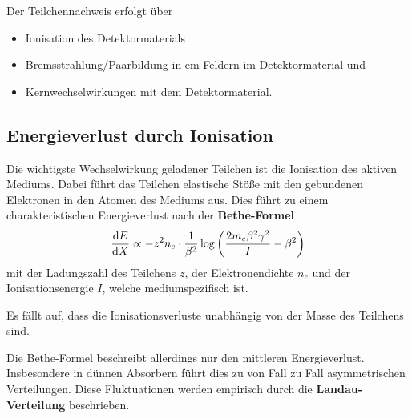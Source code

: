 Der Teilchennachweis erfolgt über
\begin{itemize}
	\item Ionisation des Detektormaterials
	\item Bremsstrahlung/Paarbildung in em-Feldern im Detektormaterial und
	\item Kernwechselwirkungen mit dem Detektormaterial.
\end{itemize}

\subsection{Energieverlust durch Ionisation}
Die wichtigste Wechselwirkung geladener Teilchen ist die Ionisation des aktiven Mediums.
Dabei führt das Teilchen elastische Stöße mit den gebundenen Elektronen in den Atomen des Mediums aus.
Dies führt zu einem charakteristischen Energieverlust nach der \textbf{Bethe-Formel}
\begin{equation*}
	\diff[E]{X}\propto -z^2n_e\cdot\frac{1}{\beta^2}\log\left(\frac{2m_e\beta^2\gamma^2}{I} - \beta^2\right)
\end{equation*}
mit der Ladungszahl des Teilchens $z$, der Elektronendichte $n_e$ und der Ionisationsenergie $I$, welche mediumspezifisch ist.

Es fällt auf, dass die Ionisationsverluste unabhängig von der Masse des Teilchens sind.

Die Bethe-Formel beschreibt allerdings nur den mittleren Energieverlust.
Insbesondere in dünnen Absorbern führt dies zu von Fall zu Fall asymmetrischen Verteilungen.
Diese Fluktuationen werden empirisch durch die \textbf{Landau-Verteilung} beschrieben.

